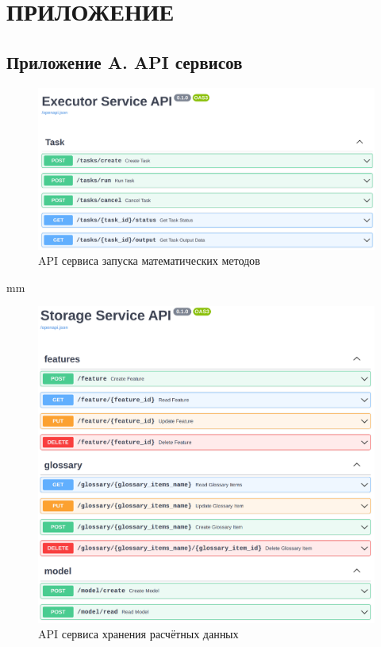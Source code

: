 \section*{\large{ПРИЛОЖЕНИЕ}}
\label{appendix}

\renewcommand{\thefigure}{A\arabic{figure}}

\setcounter{figure}{0}

\subsection*{\large{Приложение A. API сервисов}}
\begin{figure}[H]
	\includegraphics[width=\textwidth]{applications/pictures/executor_swagger}
	\caption{API сервиса запуска математических методов}
	\label{pic:application__executor-swagger}
\end{figure}
 mm
\begin{figure}[H]
	\includegraphics[width=\textwidth]{applications/pictures/storage_swagger}
	\caption{API сервиса хранения расчётных данных}
	\label{pic:application__storage-swagger}
\end{figure}
